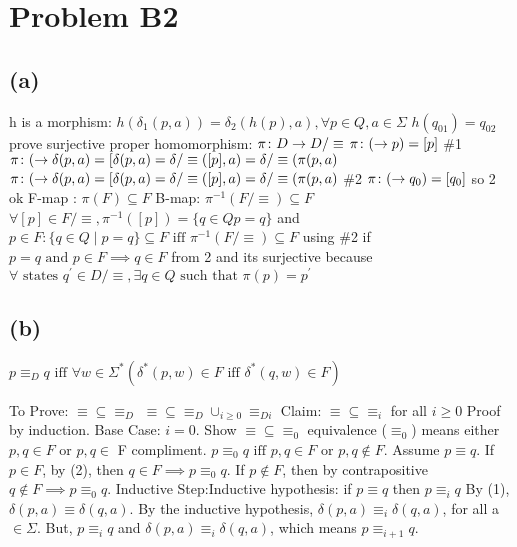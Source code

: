 \documentclass[12pt]{article}
\begin{document}
\section*{Problem B2}
\subsection*{(a)}
h is a morphism:
$h(\delta_1(p,a)) = \delta_2(h(p),a), \forall p \in Q, a \in \Sigma$
$h(q_01) = q_02$
prove surjective proper homomorphism:
$\pi\colon D\rightarrow D/\equiv$ \newline
$\pi\colon (\rightarrow p) = [p]$ \newline
\#1 $\pi\colon (\rightarrow \delta(p, a) = [\delta(p,a) = \delta/\equiv([p], a)
= \delta / \equiv({\pi}(p,a)$ \newline
$\pi\colon (\rightarrow \delta(p, a) = [\delta(p,a) = \delta/\equiv([p], a)
= \delta / \equiv({\pi}(p,a)$ \newline
\#2 $\pi\colon (\rightarrow q_0) = [q_0]$ so 2 ok \newline
F-map : ${\pi}(F) \subseteq F$ \newline
B-map: ${\pi}^{-1}(F/\equiv) \subseteq F$ \newline
$\forall [p] \in F/\equiv, {\pi}^{-1}([p]) =\{ q \in Q p = q\}$ \newline
and $p \in F : \{q \in Q \mid p = q\} \subseteq F \text{ iff }
{\pi}^{-1}(F/\equiv) \subseteq F$ using \#2 \newline
if $p=q \text{ and } p\in F \implies q \in F$ from 2 \newline
and its surjective because $\forall \text{ states } q^{'} \in D/\equiv,
\exists q \in Q \text{ such that } {\pi}(p) = p^{'}$ \newline

\subsection*{(b)}
$p \equiv_D q \text{ iff } \forall w \in \Sigma^{*}
(\delta^{*}(p,w) \in F \text{ iff } \delta^{*}(q,w) \in F)$

To Prove: $ \equiv \subseteq \equiv_D$
$\equiv \subseteq \equiv_D \cup_{i \ge 0} \equiv_{Di}$
Claim: $\equiv \subseteq \equiv_i $ for all $i \ge 0$
Proof by induction. \newline
Base Case: $i = 0$.   Show $\equiv \subseteq \equiv_0 $  equivalence ($\equiv_0 $) means either $p,q \in F$ or $p,q \in$ F compliment. 
\newline $p \equiv_{0} q \text{ iff } p,q \in F \text{ or } p,q \notin F $.  
\newline
Assume $p \equiv q$. If $p \in F$, by (2), then $q \in F \implies p \equiv_0 q$. If $p \not \in F$, then by contrapositive $q \not\in F \implies p \equiv_0 q$. 
\newline
Inductive Step:\newline Inductive hypothesis: if $p \equiv q$ then $p \equiv_i q$\newline
By (1), $\delta (p,a) \equiv \delta (q,a)$. By the inductive hypothesis, $\delta (p,a) \equiv_i \delta (q,a)$, for all a $ \in \Sigma$. But, $p \equiv_i q$ and 
$\delta(p,a) \equiv_i \delta(q,a)$, which means $p \equiv_{i+1} q$.
\end{document}

